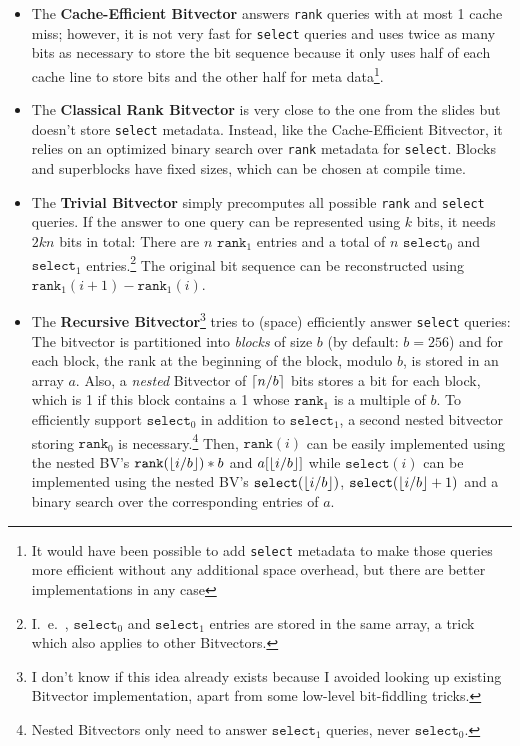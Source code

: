 \documentclass[a4paper,UKenglish,cleveref, autoref, thm-restate]{lipics-v2021}
\newcommand{\stress}[1] {\textit{#1}}
\newcommand{\rank} {\texttt{rank}}
\newcommand{\select} {\texttt{select}}
\DeclarePairedDelimiter{\ceil}{\lceil}{\rceil}
\DeclarePairedDelimiter{\floor}{\lfloor}{\rfloor}
\begin{document}
\begin{itemize}
    \item The \textbf{Cache-Efficient Bitvector} answers \rank{} queries with at most 1 cache miss; however,
    it is not very fast for \select{} queries and uses twice as many bits as necessary to store the bit sequence because it only
    uses half of each cache line to store bits and the other half for meta data\footnote{It would have been possible to add
    \select{} metadata to make those queries more efficient without any additional space overhead,
    but there are better implementations in any case}.
    \item The \textbf{Classical Rank Bitvector} is very close to the one from the slides but doesn't store \select{} metadata.
    Instead, like the Cache-Efficient Bitvector, it relies on an optimized binary search over \rank{} metadata for \select{}.
    Blocks and superblocks have fixed sizes, which can be chosen at compile time.
    \item The \textbf{Trivial Bitvector} simply precomputes all possible \rank{} and \select{} queries.
    If the answer to one query can be represented using $k$ bits, it needs $2kn$ bits in total:
    There are $n$ $\rank_1$ entries and a total of $n$ $\select_0$ and $\select_1$ entries.\footnote{I.~e.~, $\select_0$ and $\select_1$
    entries are stored in the same array, a trick which also applies to other Bitvectors.}
    The original bit sequence can be reconstructed using $\rank_1(i+1) - \rank_1(i)$.
    \item The \textbf{Recursive Bitvector}\footnote{I don't know if this idea already exists
    because I avoided looking up existing Bitvector implementation, apart from some low-level bit-fiddling tricks.}
    tries to (space) efficiently answer \select{} queries:
    The bitvector is partitioned into \stress{blocks} of size $b$ (by default: $b=256$) and for each block, the rank at the beginning of the block,
    modulo $b$, is stored in an array $a$.
    Also, a \stress{nested} Bitvector of $\ceil{n / b}$ bits stores a bit for each block,
    which is 1 if this block contains a 1 whose $\rank_1$ is a multiple of $b$.
    To efficiently support $\select_0$ in addition to $\select_1$, a second nested bitvector storing $\rank_0$ is necessary.\footnote{Nested Bitvectors only need to answer $\select_1$ queries, never $\select_0$.}
    Then, $\rank(i)$ can be easily implemented using the nested BV's $\rank(\floor{i / b}) * b$ and $a[\floor{i/b}]$ while $\select(i)$
    can be implemented using the nested BV's $\select(\floor{i / b})$, $\select(\floor{i / b} + 1)$ and a binary search over the corresponding entries of $a$.

\end{itemize}
\end{document}
